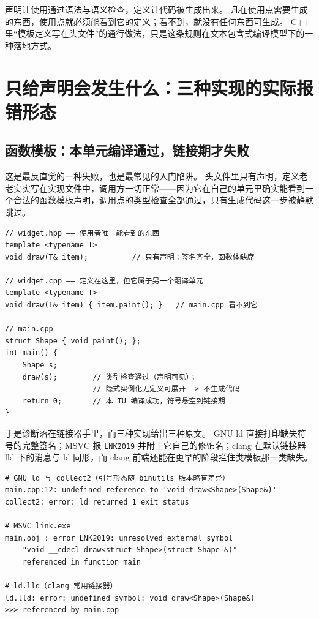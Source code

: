 \documentclass[12pt,a4paper,fontset=fandol]{ctexbook}
\newcommand{\cpp}[1]{C++#1}
\newcommand{\kw}[1]{\texttt{#1}}
\begin{document}
\begin{note}[title={一句话钉住机制}]
声明让使用通过语法与语义检查，定义让代码被生成出来。
凡在使用点需要生成的东西，使用点就必须能看到它的定义；看不到，就没有任何东西可生成。
\cpp{} 里“模板定义写在头文件”的通行做法，只是这条规则在文本包含式编译模型下的一种落地方式。
\end{note}

\section{只给声明会发生什么：三种实现的实际报错形态}

\subsection*{函数模板：本单元编译通过，链接期才失败}

这是最反直觉的一种失败，也是最常见的入门陷阱。
头文件里只有声明，定义老老实实写在实现文件中，调用方一切正常——因为它在自己的单元里确实能看到一个合法的函数模板声明，调用点的类型检查全部通过，只有生成代码这一步被静默跳过。

\begin{lstlisting}[style=cppstyle,caption={声明进头文件、定义进源文件：编译通过而链接失败的最小现场}]
// widget.hpp —— 使用者唯一能看到的东西
template <typename T>
void draw(T& item);          // 只有声明：签名齐全，函数体缺席

// widget.cpp —— 定义在这里，但它属于另一个翻译单元
template <typename T>
void draw(T& item) { item.paint(); }   // main.cpp 看不到它

// main.cpp
struct Shape { void paint(); };
int main() {
    Shape s;
    draw(s);        // 类型检查通过（声明可见）；
                    // 隐式实例化无定义可展开 -> 不生成代码
    return 0;       // 本 TU 编译成功，符号悬空到链接期
}
\end{lstlisting}

于是诊断落在链接器手里，而三种实现给出三种原文。
GNU ld 直接打印缺失符号的完整签名；MSVC 报 \kw{LNK2019} 并附上它自己的修饰名；clang 在默认链接器 lld 下的消息与 ld 同形，而 clang 前端还能在更早的阶段拦住类模板那一类缺失。

\begin{lstlisting}[style=cppstyle,caption={同一段代码在 GNU ld、MSVC、lld 下的链接期原文}]
# GNU ld 与 collect2（引号形态随 binutils 版本略有差异）
main.cpp:12: undefined reference to 'void draw<Shape>(Shape&)'
collect2: error: ld returned 1 exit status

# MSVC link.exe
main.obj : error LNK2019: unresolved external symbol
    "void __cdecl draw<struct Shape>(struct Shape &)"
    referenced in function main

# ld.lld（clang 常用链接器）
ld.lld: error: undefined symbol: void draw<Shape>(Shape&)
>>> referenced by main.cpp
\end{lstlisting}
\end{document}
